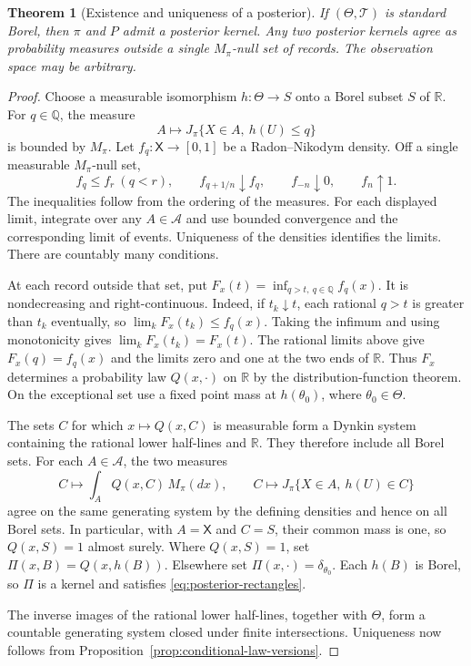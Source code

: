 \documentclass[11pt,oneside]{book}
\newtheorem{theorem}{Theorem}[chapter]
\theoremstyle{definition}
\theoremstyle{remark}
\newcommand{\R}{\mathbb R}
\begin{document}
\begin{theorem}[Existence and uniqueness of a posterior]
\label{thm:bayesian-posterior-existence}
If $(\Theta,\mathcal T)$ is standard Borel, then $\pi$ and $P$
admit a posterior kernel. Any two posterior kernels agree as
probability measures outside a single $M_\pi$-null set of records.
The observation space may be arbitrary.
\end{theorem}
\begin{proof}
Choose a measurable isomorphism $h:\Theta\to S$ onto a Borel subset
$S$ of $\R$. For $q\in\mathbb Q$, the measure
\[
A\longmapsto J_\pi\{X\in A,\ h(U)\leq q\}
\]
is bounded by $M_\pi$. Let $f_q:\mathsf X\to[0,1]$ be a
Radon--Nikodym density. Off a single measurable $M_\pi$-null set,
\[
f_q\leq f_r\ (q<r),\qquad
f_{q+1/n}\downarrow f_q,\qquad
f_{-n}\downarrow 0,\qquad f_n\uparrow 1 .
\]
The inequalities follow from the ordering of the measures. For each
displayed limit, integrate over any $A\in\mathcal A$ and use bounded
convergence and the corresponding limit of events. Uniqueness of the
densities identifies the limits. There are countably many conditions.

At each record outside that set, put $F_x(t)=\inf_{q>t,\ q\in\mathbb Q}
f_q(x)$. It is nondecreasing and right-continuous. Indeed, if $t_k\downarrow
t$, each rational $q>t$ is greater than $t_k$ eventually, so
$\lim_k F_x(t_k)\leq f_q(x)$. Taking the infimum and using monotonicity
gives $\lim_k F_x(t_k)=F_x(t)$. The rational limits above give
$F_x(q)=f_q(x)$ and the limits zero and one at the two ends of $\R$.
Thus $F_x$ determines a probability law $Q(x,\cdot)$ on $\R$ by the
distribution-function theorem. On the exceptional set use a fixed point
mass at $h(\theta_0)$, where $\theta_0\in\Theta$.

The sets $C$ for which $x\mapsto Q(x,C)$ is measurable form a
Dynkin system containing the rational lower half-lines and $\R$.
They therefore include all Borel sets. For each $A\in\mathcal A$,
the two measures
\[
C\longmapsto \int_A Q(x,C)\,M_\pi(dx),\qquad
C\longmapsto J_\pi\{X\in A,\ h(U)\in C\}
\]
agree on the same generating system by the defining densities and
hence on all Borel sets. In particular, with $A=\mathsf X$ and
$C=S$, their common mass is one, so $Q(x,S)=1$ almost surely.
Where $Q(x,S)=1$, set $\Pi(x,B)=Q(x,h(B))$. Elsewhere set
$\Pi(x,\cdot)=\delta_{\theta_0}$. Each $h(B)$ is Borel, so $\Pi$
is a kernel and satisfies \eqref{eq:posterior-rectangles}.

The inverse images of the rational lower half-lines, together with
$\Theta$, form a countable generating system closed under finite
intersections. Uniqueness now follows from
Proposition~\ref{prop:conditional-law-versions}.
\end{proof}
\end{document}
